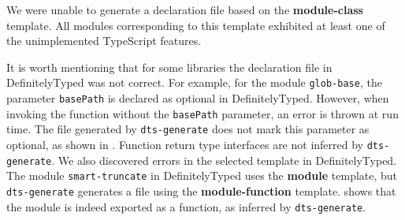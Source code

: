 \documentclass[sigconf]{acmart}
\begin{document}
We were unable to  generate a declaration file based on the
\textbf{module-class} template. All modules corresponding to this template exhibited at least one of
the unimplemented TypeScript features. 

It is worth mentioning that for some libraries the declaration file in DefinitelyTyped was
not correct. For example, for the module \texttt{glob-base}, the parameter
\texttt{basePath} is declared as optional in DefinitelyTyped. However, when invoking the
function without the \texttt{basePath} parameter, an error is thrown at run time. The file generated by
\texttt{dts-generate} does not mark this parameter as optional, as shown in
. Function return type interfaces are
not inferred by \texttt{dts-generate}.
We also
discovered errors in the selected template in DefinitelyTyped. The module
\texttt{smart-truncate} in DefinitelyTyped uses the \textbf{module} template, but
\texttt{dts-generate} generates a file using the \textbf{module-function}
template.  shows that the module is indeed
exported as a function, as inferred by \texttt{dts-generate}.
\end{document}
